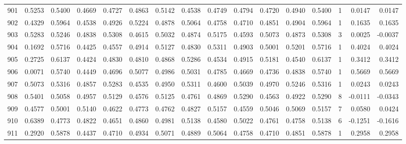 \begin{tabular}{lrrrrrrrrrrrrrrr}
901 &      0.5253 &  0.5400 &  0.4669 &  0.4727 &  0.4863 &  0.5142 &  0.4538 &  0.4749 &  0.4794 &  0.4720 &   0.4940 &     0.5400 &      1 &                    0.0147 &                     0.0147 \\
902 &      0.4329 &  0.5964 &  0.4538 &  0.4926 &  0.5224 &  0.4878 &  0.5064 &  0.4758 &  0.4710 &  0.4851 &   0.4904 &     0.5964 &      1 &                    0.1635 &                     0.1635 \\
903 &      0.5283 &  0.5246 &  0.4838 &  0.5308 &  0.4615 &  0.5032 &  0.4874 &  0.5175 &  0.4593 &  0.5073 &   0.4873 &     0.5308 &      3 &                    0.0025 &                    -0.0037 \\
904 &      0.1692 &  0.5716 &  0.4425 &  0.4557 &  0.4914 &  0.5127 &  0.4830 &  0.5311 &  0.4903 &  0.5001 &   0.5201 &     0.5716 &      1 &                    0.4024 &                     0.4024 \\
905 &      0.2725 &  0.6137 &  0.4424 &  0.4830 &  0.4810 &  0.4868 &  0.5286 &  0.4534 &  0.4915 &  0.5181 &   0.4540 &     0.6137 &      1 &                    0.3412 &                     0.3412 \\
906 &      0.0071 &  0.5740 &  0.4449 &  0.4696 &  0.5077 &  0.4986 &  0.5031 &  0.4785 &  0.4669 &  0.4736 &   0.4838 &     0.5740 &      1 &                    0.5669 &                     0.5669 \\
907 &      0.5073 &  0.5316 &  0.4857 &  0.5283 &  0.4535 &  0.4950 &  0.5311 &  0.4600 &  0.5039 &  0.4970 &   0.5246 &     0.5316 &      1 &                    0.0243 &                     0.0243 \\
908 &      0.5401 &  0.5058 &  0.4957 &  0.5129 &  0.4576 &  0.5125 &  0.4761 &  0.4869 &  0.5290 &  0.4563 &   0.4922 &     0.5290 &      8 &                   -0.0111 &                    -0.0343 \\
909 &      0.4577 &  0.5001 &  0.5140 &  0.4622 &  0.4773 &  0.4762 &  0.4827 &  0.5157 &  0.4559 &  0.5046 &   0.5069 &     0.5157 &      7 &                    0.0580 &                     0.0424 \\
910 &      0.6389 &  0.4773 &  0.4822 &  0.4651 &  0.4860 &  0.4981 &  0.5138 &  0.4580 &  0.5022 &  0.4761 &   0.4758 &     0.5138 &      6 &                   -0.1251 &                    -0.1616 \\
911 &      0.2920 &  0.5878 &  0.4437 &  0.4710 &  0.4934 &  0.5071 &  0.4889 &  0.5064 &  0.4758 &  0.4710 &   0.4851 &     0.5878 &      1 &                    0.2958 &                     0.2958 \\

\end{tabular}
